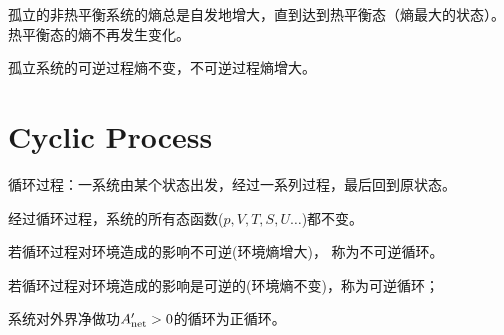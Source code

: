 \documentclass[CJK]{beamer}
\begin{document}
\begin{frame}
\bchL

\bitem
\item{\blue 孤立的非热平衡系统的熵总是自发地增大，直到达到热平衡态（熵最大的状态）。热平衡态的熵不再发生变化。}
\item{\blue 孤立系统的可逆过程熵不变，不可逆过程熵增大。}
\eitem


\echL
\end{frame}


\section{Cyclic Process}

\begin{frame}
\bch
{}
\ech
\end{frame}

\begin{frame}
\bchL
{\blue 循环过程}：一系统由某个状态出发，经过一系列过程，最后{\blue 回到原状态。}

\emini
{}
{\blue 经过循环过程，系统的所有态函数($p, V, T, S, U\ldots$)都不变。}
\emini
\echL
\end{frame}


\begin{frame}
\bchL



\emini
{}
\emini

\bitem
\item{若循环过程对环境造成的影响不可逆(环境熵增大)， {\blue 称为不可逆循环}。}
\item{若循环过程对环境造成的影响是可逆的(环境熵不变)，称为{\blue 可逆循环}；}
\eitem
\echL
\end{frame}

\begin{frame}
\bchL

系统对外界净做功$A'_{\rm net}>0$的循环为正循环。

\echL
\end{frame}
\end{document}
